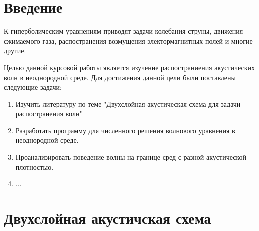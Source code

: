 \documentclass[a4paper, fontsize=14pt]{article}
\begin{document}
%
\newpage
\tableofcontents
\newpage
\section*{Введение}
К гиперболическим уравнениям приводят задачи колебания струны, движения сжимаемого газа,
распостранения возмущения электормагнитных полей и многие другие.

Целью данной курсовой работы является изучение распостраниения акустических волн в неоднородной
среде. Для достижения данной цели были поставлены следующие задачи:
\begin{enumerate}
    \item Изучить литературу по теме "Двухслойная акустическая схема для задачи распостранения волн"
    \item Разработать программу для численного решения волнового уравнения в неоднородной среде.
    \item Проанализировать поведение волны на границе сред с разной акустической плотностью.
    \item ...
\end{enumerate}
\newpage
\section{Двухслойная акустичская схема}
\end{document}
